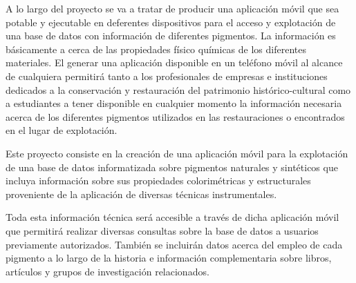 A lo largo del proyecto se va a tratar de producir una aplicación móvil que sea potable y ejecutable en deferentes dispositivos para el acceso y explotación de una base de datos con información de diferentes pigmentos. La información es básicamente a cerca de las propiedades físico químicas de los diferentes materiales. El generar una aplicación disponible en un teléfono móvil al alcance de cualquiera permitirá tanto a los profesionales de empresas e instituciones dedicados a la conservación y restauración del patrimonio histórico-cultural como a estudiantes a tener disponible en cualquier momento la información necesaria acerca de los diferentes pigmentos utilizados en las restauraciones o encontrados en el lugar de explotación. 

Este proyecto consiste en la creación de una aplicación móvil para la explotación de una base de datos informatizada sobre pigmentos naturales y sintéticos que incluya información sobre sus propiedades colorimétricas y estructurales proveniente de la aplicación de diversas técnicas instrumentales. 

Toda esta información técnica será accesible a través de dicha aplicación móvil que permitirá realizar diversas consultas sobre la base de datos a usuarios previamente autorizados. También se incluirán datos acerca del empleo de cada pigmento a lo largo de la historia e información complementaria sobre libros, artículos y grupos de investigación relacionados. 